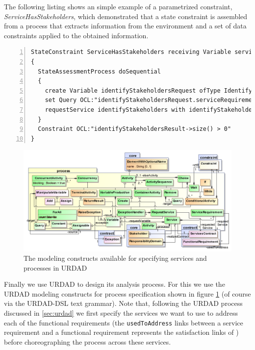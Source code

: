\begin{itemize}
\begin{itemize}
The following listing shows an simple example of a parametrized constraint, \emph{ServiceHasStakeholders}, which demonstrated that a state constraint is assembled from a process that extracts information from the environment and a set of data constraints applied to the obtained information.
\lstset{language=urdad,caption=Specifying a state constraint in the URDAD text grammar.,label=processTextSyntax}
\begin{lstlisting}[numbers=left,escapechar=|]
StateConstraint ServiceHasStakeholders receiving Variable serviceRequirements ofType _ServiceRequirements 
{
  StateAssessmentProcess doSequential 
  {
    create Variable identifyStakeholdersRequest ofType IdentifyStakeholdersRequest
    set Query OCL:"identifyStakeholdersRequest.serviceRequirements" equalTo Query OCL:"serviceRequirements"
    requestService identifyStakeholders with identifyStakeholdersRequest yielding Variable identifyStakeholdersResult ofType IdentifyStakeholdersResult
  }
  Constraint OCL:"identifyStakeholdersResult->size() > 0"
}
\end{lstlisting}

\begin{figure}[Htbp]
  \centering
  \includegraphics{process}
  \caption{The modeling constructs available for specifying services and processes in URDAD}
  \label{fig:processModule}
\end{figure}

Finally we use URDAD to design its analysis process. For this we use the URDAD modeling constructs for process specification shown in figure \ref{fig:processModule} (of course via the URDAD-DSL text grammar). Note that, following the URDAD process discussed in \ref{sec:urdad} we first specify the services we want to use to address each of the functional requirements (the \verb+usedToAddress+ links between a service requirement and a functional requirement represents the satisfaction links of \cite{ramesh_toward_2001}) before choreographing the process across these services. 


\end{itemize}
\end{itemize}

